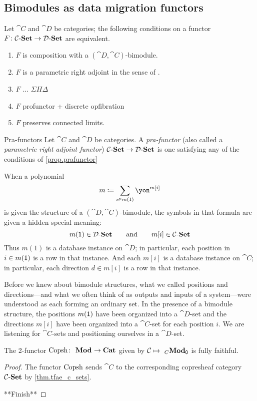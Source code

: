 \documentclass[Book-Poly]{subfiles}
\begin{document}
\subsection{Bimodules as data migration functors}


\begin{proposition}\label{prop.prafunctor}
Let $\cat{C}$ and $\cat{D}$ be categories; the following conditions on a functor $F\colon\mathcal{C}\textnormal{-}\textbf{Set}\to\mathcal{D}\textnormal{-}\textbf{Set}$ are equivalent.
\begin{enumerate}
	\item $F$ is composition with a $(\cat{D},\cat{C})$-bimodule.
	\item $F$ is a parametric right adjoint in the sense of \cite{}.
	\item $F$ ... $\Sigma\Pi\Delta$
	\item $F$ profunctor + discrete opfibration
	\item $F$ preserves connected limits.
\end{enumerate}
\end{proposition}

\begin{definition}{Pra-functors}
Let $\cat{C}$ and $\cat{D}$ be categories. A \emph{pra-functor} (also called a \emph{parametric right adjoint functor}) $\mathcal{C}\textnormal{-}\textbf{Set}\to\mathcal{D}\textnormal{-}\textbf{Set}$ is one satisfying any of the conditions of \cref{prop.prafunctor}
\end{definition}

When a polynomial
\[
m\coloneqq\sum_{i\in m(\1)}\yon^{m[i]}
\]
is given the structure of a $(\cat{D},\cat{C})$-bimodule, the symbols in that formula are given a hidden special meaning:
\[
  m(\textsf{1})\in\mathcal{D}\textnormal{-}\textbf{Set}
  \qquad\text{and}\qquad
	m[i]\in\mathcal{C}\textnormal{-}\textbf{Set}
\]
Thus $m(1)$ is a database instance on $\cat{D}$; in particular, each position in $i\in m(\textsf{1})$ is a row in that instance. And each $m[i]$ is a database instance on $\cat{C}$; in particular, each direction $d\in m[i]$ is a row in that instance.

Before we knew about bimodule structures, what we called positions and directions---and what we often think of as outputs and inputs of a system---were understood as each forming an ordinary set. In the presence of a bimodule structure, the positions $m(\textsf{1})$ have been organized into a $\cat{D}$-set and the directions $m[i]$ have been organized into a $\cat{C}$-set for each position $i$. We are listening for $\cat{C}$-sets and positioning ourselves in a $\cat{D}$-set.

\begin{theorem}
The 2-functor $\mathrm{Copsh}\colon~_{}\textbf{Mod}_{}\to\textbf{Cat}$ given by $\mathcal{C}\mapsto~_{C}\textbf{Mod}_{\textsf{0}}$ is fully faithful.
\end{theorem}
\begin{proof}
The functor $\mathrm{Copsh}$ sends $\cat{C}$ to the corresponding copresheaf category $\mathcal{C}\textnormal{-}\textbf{Set}$ by \cref{thm.tfae_c_sets}.

**Finish**
\end{proof}
\end{document}
